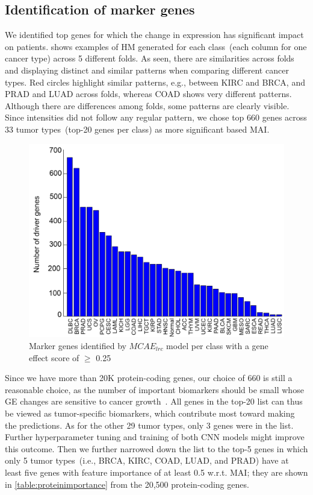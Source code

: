 \subsection{Identification of marker genes}
We identified top genes for which the change in expression has significant impact on patients.  shows examples of HM generated for each class~(each column for one cancer type) across 5 different folds. As seen, there are similarities across folds and displaying distinct and similar patterns when comparing different cancer types. Red circles highlight similar patterns, e.g., between KIRC and BRCA, and PRAD and LUAD across folds, whereas COAD shows very different patterns. Although there are differences among folds, some patterns are clearly visible. Since intensities did not follow any regular pattern, we chose top 660 genes across 33 tumor types~(top-20 genes per class) as more significant based MAI. 

\begin{figure}[h]
    \centering
	\includegraphics[scale=0.8]{images/driver_genes.png}
	\caption{Marker genes identified by $MCAE_{lrc}$ model per class with a gene effect score of $\geq$ 0.25}
    \label{fig:dg_cnn}
\end{figure}

\hspace*{3.5mm} Since we have more than 20K protein-coding genes, our choice of 660 is still a reasonable choice, as the number of important biomarkers should be small whose GE changes are sensitive to cancer growth~\cite{zuo2019identification}. All genes in the top-20 list can thus be viewed as tumor-specific biomarkers, which contribute most toward making the predictions. As for the other 29 tumor types, only 3 genes were in the list. Further hyperparameter tuning and training of both CNN models might improve this outcome. Then we further narrowed down the list to the top-5 genes in which only 5 tumor types~(i.e., BRCA, KIRC, COAD, LUAD, and PRAD) have at least five genes with feature importance of at least 0.5 w.r.t. MAI; they are shown in \cref{table:proteinimportance} from the 20,500 protein-coding genes. 

